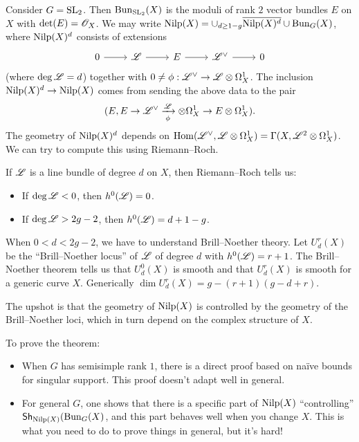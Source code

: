 \documentclass{article}
\begin{document}
\begin{ex}
  Consider $G = \operatorname{SL}_2$.
  Then $\operatorname{Bun}_{\operatorname{SL}_2}(X)$ is the moduli of rank $2$ vector bundles $E$ on $X$ with $\det(E) = \mathscr{O}_X$.
  We may write $\operatorname{Nilp}(X) = \cup_{d \geq 1 - g} \overline{\operatorname{Nilp}(X)^d} \cup \operatorname{Bun}_G(X)$, where $\operatorname{Nilp}(X)^d$ consists of extensions
  \[
    \begin{tikzcd}
      0 \rar & \Lsc \rar & E \rar & \Lsc^\vee \rar & 0
    \end{tikzcd}
  \]
  (where $\deg \mathscr{L} = d$) together with $0 \neq \phi: \mathscr{L}^\vee \to \mathscr{L} \otimes \Omega_X^1$.
  The inclusion $\operatorname{Nilp}(X)^d \to \operatorname{Nilp}(X)$ comes from sending the above data to the pair
  \[
    (E, E \to \mathscr{L}^\vee \xrightarrow[\phi] {\mathscr{L}} \otimes \Omega^1_X \to E \otimes \Omega^1_X).
  \]
  The geometry of $\operatorname{Nilp}(X)^d$ depends on $\operatorname{Hom}(\mathscr{L}^\vee, \mathscr{L} \otimes \Omega^1_X) = \Gamma(X, \mathscr{L}^2 \otimes \Omega^1_X)$.
  We can try to compute this using Riemann--Roch.

  If $\mathscr{L}$ is a line bundle of degree $d$ on $X$, then Riemann--Roch tells us:
  \begin{itemize}
    \item If $\deg \mathscr{L} < 0$, then $h^0(\mathscr{L}) = 0$.
    \item If $\deg \mathscr{L} > 2g-2$, then $h^0(\mathscr{L}) = d + 1 - g$.
  \end{itemize}
  When $0 < d < 2g-2$, we have to understand Brill--Noether theory.
  Let $U^r_d(X)$ be the ``Brill--Noether locus'' of $\mathscr{L}$ of degree $d$ with $h^0(\mathscr{L}) = r + 1$.
  The Brill--Noether theorem tells us that $U^0_d(X)$ is smooth and that $U^r_d(X)$ is smooth for a generic curve $X$.
  Generically $\dim U^r_d(X) = g - (r + 1)(g - d + r)$.

  The upshot is that the geometry of $\operatorname{Nilp}(X)$ is controlled by the geometry of the Brill--Noether loci, which in turn depend on the complex structure of $X$.
\end{ex}

To prove the theorem:
\begin{itemize}
  \item When $G$ has semisimple rank $1$, there is a direct proof based on na\"ive bounds for singular support.
    This proof doesn't adapt well in general.
  \item For general $G$, one shows that there is a specific part of $\operatorname{Nilp}(X)$ ``controlling'' $\mathsf{Sh}_{\operatorname{Nilp}(X)}(\operatorname{Bun}_G(X)$, and this part behaves well when you change $X$.
    This is what you need to do to prove things in general, but it's hard!
\end{itemize}
\end{document}
